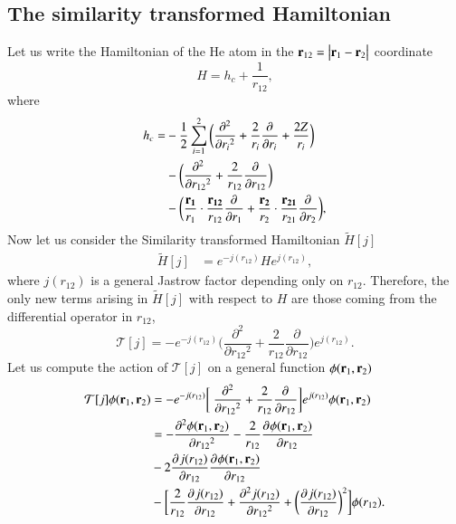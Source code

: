\documentclass[aip,jcp,reprint,noshowkeys,superscriptaddress]{revtex4-1}
\newcommand{\deriv}[3]{\frac{\partial^{#3} #1}{\partial {#2}^{#3}}}
\newcommand{\bd}[1]{{\bf {#1}}}
\newcommand{\br}[0]{{\bf {r}}}
\begin{document}
\subsection{The similarity transformed Hamiltonian}
Let us write the Hamiltonian of the He atom in the ${\bf r}_{12} = \big|{\bf r}_1 - {\bf r}_2 \big|$ coordinate 
\begin{equation}
 H  = h_c + \frac{1}{r_{12}},
\end{equation}
where 
\begin{equation}
 \begin{aligned}
 h_c = &-\frac{1}{2} \sum_{i=1}^2 \bigg(\deriv{}{r_i}{2} + \frac{2}{r_i} \deriv{}{r_i}{} + \frac{2 Z}{r_i}\bigg) \\
     &-\bigg( \deriv{}{r_{12}}{2} + \frac{2}{r_{12}} \deriv{}{r_{12}}{} \bigg) \\
     &-\bigg( \frac{\bd{r_1}}{r_1} \cdot \frac{\bd{r_{12}} }{r_{12}}  \deriv{}{r_1}{} + 
                \frac{\bd{r_2}}{r_2} \cdot \frac{\bd{r_{21}} }{r_{21}}  \deriv{}{r_2}{} \bigg),
 \end{aligned}
\end{equation}
\label{sec:he_j}
Now let us consider the Similarity transformed Hamiltonian $\tilde{H}[j]$
\begin{equation}
 \label{eq:ht_0}
 \begin{aligned}
 \tilde{H}[j]&= e^{-j(r_{12})} H e^{j(r_{12})},
 \end{aligned}
\end{equation}
where $j(r_{12})$ is a general Jastrow factor depending only on $r_{12}$. 
Therefore, the only new terms arising in $\tilde{H}[j]$ with respect to $H$ are those coming from the differential operator in $r_{12}$,
\begin{equation}
 \mathcal{T}[j] =  -e^{-j(r_{12})}\bigg( \deriv{}{r_{12}}{2} + \frac{2}{r_{12}} \deriv{}{r_{12}}{} \bigg)e^{j(r_{12})}.  
\end{equation}
Let us compute the action of $\mathcal{T}[j]$ on a general function $\phi(\br{}_1,\br{}_2)$ 
\begin{equation}
 \begin{aligned}
 \mathcal{T}[j]\phi(\br{}_1,\br{}_2) & =- e^{-j(r_{12})} \bigg[ \deriv{}{r_{12}}{2} + \frac{2}{r_{12}} \deriv{}{r_{12}}{}\bigg]  e^{j(r_{12})} \phi(\br{}_1,\br{}_2) \\ 
                            &=  -\deriv{\phi(\br{}_1,\br{}_2)}{r_{12}}{2} - \frac{2}{r_{12}} \deriv{\phi(\br{}_1,\br{}_2)}{r_{12}}{} \\
  &- 2 \deriv{j(r_{12})}{r_{12}}{} \deriv{\phi(\br{}_1,\br{}_2)}{r_{12}}{} \\ 
  &- \bigg[ \frac{2}{r_{12}} \deriv{j(r_{12})}{r_{12}}{}  + \deriv{j(r_{12})}{r_{12}}{2} + \bigg( \deriv{j(r_{12})}{r_{12}}{} \bigg)^2\bigg] \phi(r_{12}). 
 \end{aligned}
\end{equation}
\end{document}

